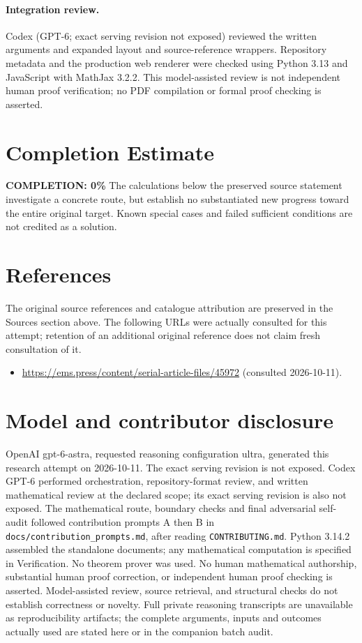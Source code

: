 \documentclass[11pt]{article}
\begin{document}
\paragraph{Integration review.} Codex (GPT-6; exact serving revision not exposed) reviewed the written arguments and expanded layout and source-reference wrappers. Repository metadata and the production web renderer were checked using Python 3.13 and JavaScript with MathJax 3.2.2. This model-assisted review is not independent human proof verification; no PDF compilation or formal proof checking is asserted.

\section{Completion Estimate}
\noindent\textbf{COMPLETION: 0\%}
The calculations below the preserved source statement investigate a concrete route,
but establish no substantiated new progress toward the entire original target.
Known special cases and failed sufficient conditions are not credited as a solution.
\section{References}
The original source references and catalogue attribution are preserved in the
Sources section above. The following URLs were actually consulted for this attempt;
retention of an additional original reference does not claim fresh consultation of it.
\begin{itemize}
\item \url{https://ems.press/content/serial-article-files/45972} (consulted 2026-10-11). 
\end{itemize}
\section{Model and contributor disclosure}
OpenAI gpt-6-astra, requested reasoning configuration ultra, generated this research
attempt on 2026-10-11. The exact serving revision is not exposed. Codex GPT-6
performed orchestration, repository-format review, and written mathematical review at the declared scope; its exact serving revision
is also not exposed. The mathematical route, boundary checks and final adversarial
self-audit followed contribution prompts A then B in
\texttt{docs/contribution\_prompts.md}, after reading \texttt{CONTRIBUTING.md}.
Python 3.14.2 assembled the standalone documents; any mathematical computation is
specified in Verification. No theorem prover was used. No human mathematical
authorship, substantial human proof correction, or independent human proof checking
is asserted. Model-assisted review, source retrieval, and structural checks do not
establish correctness or novelty. Full private reasoning transcripts are unavailable
as reproducibility artifacts; the complete arguments, inputs and outcomes actually
used are stated here or in the companion batch audit.
\end{document}
